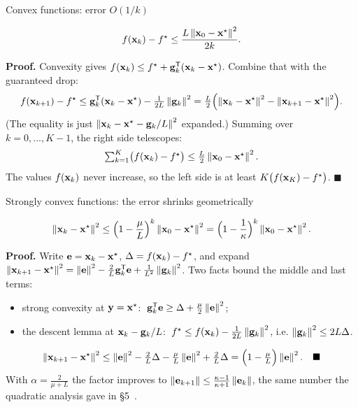 \begin{frame}{Convex functions: error $O(1/k)$}
  \begin{thmbox}[Theorem ($L$-smooth, convex, $\alpha = 1/L$)]
    \[ f(\mathbf{x}_k) - f^\star \le \frac{L\left\lVert \mathbf{x}_0-\mathbf{x}^\star \right\rVert^2}{2k}. \]
  \end{thmbox}
  \small\textbf{Proof.}
  \pause
  Convexity gives $f(\mathbf{x}_k)\le f^\star + \mathbf{g}_k^{\mathsf T}(\mathbf{x}_k-\mathbf{x}^\star)$. Combine that with the guaranteed drop:
  \[
    f(\mathbf{x}_{k+1}) - f^\star \le \mathbf{g}_k^{\mathsf T}(\mathbf{x}_k-\mathbf{x}^\star) - \tfrac{1}{2L}\left\lVert \mathbf{g}_k \right\rVert^2
    = \tfrac L2\Bigl(\left\lVert \mathbf{x}_k-\mathbf{x}^\star \right\rVert^2 - \left\lVert \mathbf{x}_{k+1}-\mathbf{x}^\star \right\rVert^2\Bigr).
  \]
  \pause
  (The equality is just $\left\lVert \mathbf{x}_k - \mathbf{x}^\star - \mathbf{g}_k/L \right\rVert^2$ expanded.) Summing over $k = 0,\dots,K-1$, the right side
  telescopes:
  \[
    \textstyle\sum_{k=1}^{K}\bigl(f(\mathbf{x}_k)-f^\star\bigr)\le\tfrac L2\left\lVert \mathbf{x}_0-\mathbf{x}^\star \right\rVert^2 .
  \]
  \pause
  The values $f(\mathbf{x}_k)$ never increase, so the left side is at least $K\bigl(f(\mathbf{x}_K)-f^\star\bigr)$. $\blacksquare$
\end{frame}

\begin{frame}{Strongly convex functions: the error shrinks geometrically}
  \begin{thmbox}[Theorem ($L$-smooth, $\mu$-strongly convex, $\alpha = 1/L$)]
    \[ \left\lVert \mathbf{x}_{k}-\mathbf{x}^\star \right\rVert^2 \le \Bigl(1-\frac{\mu}{L}\Bigr)^{k}\left\lVert \mathbf{x}_0-\mathbf{x}^\star \right\rVert^2 = \Bigl(1-\frac1\kappa\Bigr)^k\left\lVert \mathbf{x}_0-\mathbf{x}^\star \right\rVert^2. \]
  \end{thmbox}
  \small\textbf{Proof.} Write $\mathbf{e} = \mathbf{x}_k-\mathbf{x}^\star$, $\Delta = f(\mathbf{x}_k)-f^\star$, and expand
  $\left\lVert \mathbf{x}_{k+1}-\mathbf{x}^\star \right\rVert^2 = \left\lVert \mathbf{e} \right\rVert^2 - \tfrac2L\mathbf{g}_k^{\mathsf T}\mathbf{e} + \tfrac1{L^2}\left\lVert \mathbf{g}_k \right\rVert^2$. Two facts bound the middle and last terms:
  \pause
  \begin{itemize}\footnotesize
    \item strong convexity at $\mathbf{y}=\mathbf{x}^\star$: $\;\mathbf{g}_k^{\mathsf T}\mathbf{e}\ge\Delta+\tfrac\mu2\left\lVert \mathbf{e} \right\rVert^2$;
    \item the descent lemma at $\mathbf{x}_k-\mathbf{g}_k/L$: $\;f^\star\le f(\mathbf{x}_k)-\tfrac1{2L}\left\lVert \mathbf{g}_k \right\rVert^2$, i.e. $\left\lVert \mathbf{g}_k \right\rVert^2\le2L\Delta$.
  \end{itemize}
  \pause
  \[
    \left\lVert \mathbf{x}_{k+1}-\mathbf{x}^\star \right\rVert^2\le\left\lVert \mathbf{e} \right\rVert^2-\tfrac2L\Delta-\tfrac\mu L\left\lVert \mathbf{e} \right\rVert^2+\tfrac2L\Delta
    =\Bigl(1-\tfrac\mu L\Bigr)\left\lVert \mathbf{e} \right\rVert^2. \quad\blacksquare
  \]
  \pause
  \footnotesize With $\alpha = \frac{2}{\mu+L}$ the factor improves to $\left\lVert \mathbf{e}_{k+1} \right\rVert\le\frac{\kappa-1}{\kappa+1}\left\lVert \mathbf{e}_k \right\rVert$,
  the same number the quadratic analysis gave in \S5~\cite{nesterov2018}.
\end{frame}

